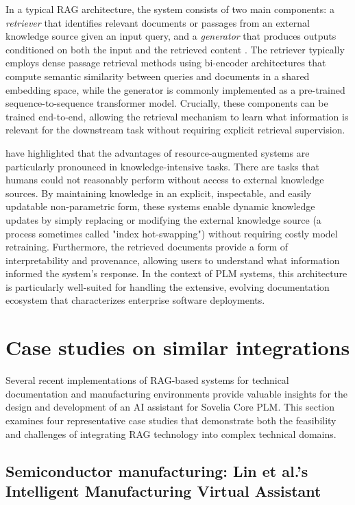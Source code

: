 In a typical RAG architecture, the system consists of two main components: a \emph{retriever} that identifies relevant documents or passages from an external knowledge source given an input query, and a \emph{generator} that produces outputs conditioned on both the input and the retrieved content \parencite{lewis_retrieval-augmented_2021}. The retriever typically employs dense passage retrieval methods using bi-encoder architectures that compute semantic similarity between queries and documents in a shared embedding space, while the generator is commonly implemented as a pre-trained sequence-to-sequence transformer model. Crucially, these components can be trained end-to-end, allowing the retrieval mechanism to learn what information is relevant for the downstream task without requiring explicit retrieval supervision.

\textcite{lewis_retrieval-augmented_2021} have highlighted that the advantages of resource-augmented systems are particularly pronounced in knowledge-intensive tasks. There are tasks that humans could not reasonably perform without access to external knowledge sources. By maintaining knowledge in an explicit, inspectable, and easily updatable non-parametric form, these systems enable dynamic knowledge updates by simply replacing or modifying the external knowledge source (a process sometimes called "index hot-swapping") without requiring costly model retraining. Furthermore, the retrieved documents provide a form of interpretability and provenance, allowing users to understand what information informed the system's response. In the context of PLM systems, this architecture is particularly well-suited for handling the extensive, evolving documentation ecosystem that characterizes enterprise software deployments.

\section{Case studies on similar integrations}
\label{sec:case-studies-on-similar-integrations}

Several recent implementations of RAG-based systems for technical documentation and manufacturing environments provide valuable insights for the design and development of an AI assistant for Sovelia Core PLM. This section examines four representative case studies that demonstrate both the feasibility and challenges of integrating RAG technology into complex technical domains.

\subsection{Semiconductor manufacturing: Lin et al.'s Intelligent Manufacturing Virtual Assistant}


